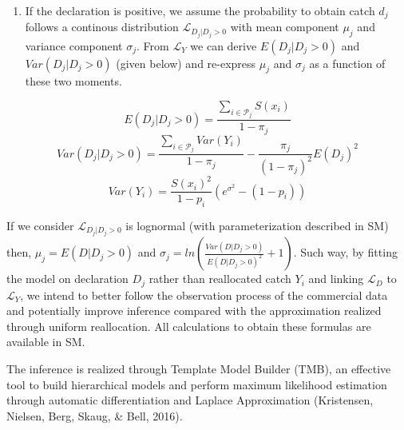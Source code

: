 \documentclass[
  english,
  man,floatsintext]{apa6}
\providecommand{\tightlist}{%
  \setlength{\itemsep}{0pt}\setlength{\parskip}{0pt}}
\begin{document}
\begin{enumerate}
\def\labelenumi{(\arabic{enumi})}
\setcounter{enumi}{1}
\tightlist
\item
  If the declaration is positive, we assume the probability to obtain catch \(d_j\) follows a continous distribution \(\mathcal{L}_{D_j|D_j>0}\) with mean component \(\mu_j\) and variance component \(\sigma_j\). From \(\mathcal{L}_Y\) we can derive \(E(D_j \vert D_j > 0)\) and \(Var(D_j \vert D_j > 0)\) (given below) and re-express \(\mu_j\) and \(\sigma_j\) as a function of these two moments.
\end{enumerate}

\[E(D_j \vert D_j > 0)=\frac{\sum_{i \in \mathcal{P}_j} S(x_{i})}{1-\pi_j}\]
\[Var(D_j \vert D_j > 0) = \frac{\sum_{i \in \mathcal{P}_j} Var(Y_{i})}{1-\pi_j} - \frac{\pi_j}{(1-\pi_j)^2}E(D_j)^2\]
\[Var(Y_{i})=\frac{S(x_{i})^2}{1-p_{i}}(e^{\sigma^2}-(1-p_{i}))\]

If we consider \(\mathcal{L}_{D_j|D_j>0}\) is lognormal (with parameterization described in SM) then, \(\mu_j = E(D|D_j>0)\) and \(\sigma_j = ln(\frac{Var(D|D_j>0)}{E(D|D_j>0)^2} + 1)\). Such way, by fitting the model on declaration \(D_j\) rather than reallocated catch \(Y_i\) and linking \(\mathcal{L}_D\) to \(\mathcal{L}_Y\), we intend to better follow the observation process of the commercial data and potentially improve inference compared with the approximation realized through uniform reallocation. All calculations to obtain these formulas are available in SM.

The inference is realized through Template Model Builder (TMB), an effective tool to build hierarchical models and perform maximum likelihood estimation through automatic differentiation and Laplace Approximation (Kristensen, Nielsen, Berg, Skaug, \& Bell, 2016).
\end{document}
